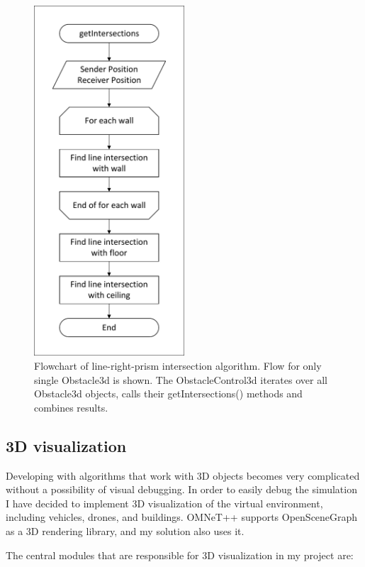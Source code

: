 \documentclass[]{nsm-thesis}
\begin{document}
\begin{figure}
	\centering
	\includegraphics[width=0.5\textwidth]{figures/Obstacle3d-flow.pdf}
	\caption{Flowchart of line-right-prism intersection algorithm. Flow for only single Obstacle3d is shown. The ObstacleControl3d iterates over all Obstacle3d objects, calls their getIntersections() methods and combines results.}
	\label{fig:obstacle3d-flow}
\end{figure}



\subsection{3D visualization}

Developing with algorithms that work with 3D objects becomes very complicated without a possibility of visual debugging. In order to easily debug the simulation I have decided to implement 3D visualization of the virtual environment, including vehicles, drones, and buildings. OMNeT++ supports OpenSceneGraph as a 3D rendering library, and my solution also uses it. 

The central modules that are responsible for 3D visualization in my project are: 
\end{document}
